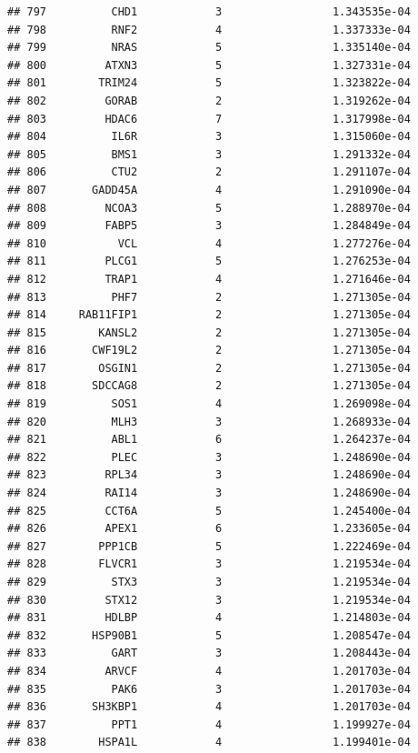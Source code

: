 \documentclass[
]{article}
\begin{document}
\begin{verbatim}
## 797          CHD1            3                 1.343535e-04
## 798          RNF2            4                 1.337333e-04
## 799          NRAS            5                 1.335140e-04
## 800         ATXN3            5                 1.327331e-04
## 801        TRIM24            5                 1.323822e-04
## 802         GORAB            2                 1.319262e-04
## 803         HDAC6            7                 1.317998e-04
## 804          IL6R            3                 1.315060e-04
## 805          BMS1            3                 1.291332e-04
## 806          CTU2            2                 1.291107e-04
## 807       GADD45A            4                 1.291090e-04
## 808         NCOA3            5                 1.288970e-04
## 809         FABP5            3                 1.284849e-04
## 810           VCL            4                 1.277276e-04
## 811         PLCG1            5                 1.276253e-04
## 812         TRAP1            4                 1.271646e-04
## 813          PHF7            2                 1.271305e-04
## 814     RAB11FIP1            2                 1.271305e-04
## 815        KANSL2            2                 1.271305e-04
## 816       CWF19L2            2                 1.271305e-04
## 817        OSGIN1            2                 1.271305e-04
## 818       SDCCAG8            2                 1.271305e-04
## 819          SOS1            4                 1.269098e-04
## 820          MLH3            3                 1.268933e-04
## 821          ABL1            6                 1.264237e-04
## 822          PLEC            3                 1.248690e-04
## 823         RPL34            3                 1.248690e-04
## 824         RAI14            3                 1.248690e-04
## 825         CCT6A            5                 1.245400e-04
## 826         APEX1            6                 1.233605e-04
## 827        PPP1CB            5                 1.222469e-04
## 828        FLVCR1            3                 1.219534e-04
## 829          STX3            3                 1.219534e-04
## 830         STX12            3                 1.219534e-04
## 831         HDLBP            4                 1.214803e-04
## 832       HSP90B1            5                 1.208547e-04
## 833          GART            3                 1.208443e-04
## 834         ARVCF            4                 1.201703e-04
## 835          PAK6            3                 1.201703e-04
## 836       SH3KBP1            4                 1.201703e-04
## 837          PPT1            4                 1.199927e-04
## 838        HSPA1L            4                 1.199401e-04

\end{verbatim}
\end{document}
